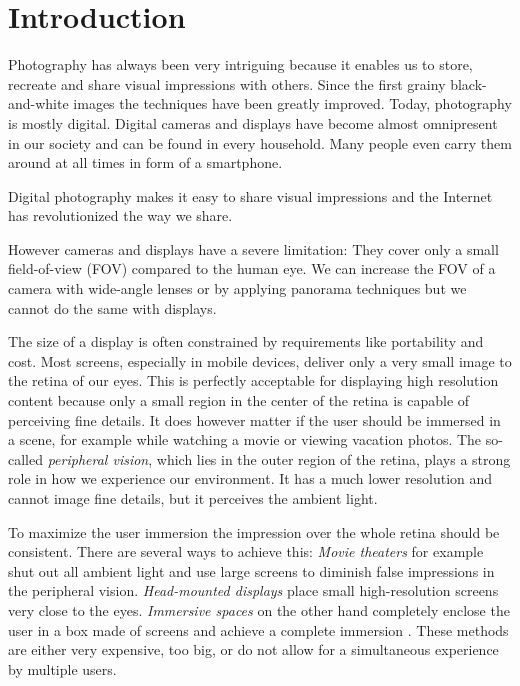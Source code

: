 \newcommand{\vect}[1]{\boldsymbol{#1}}

\chapter{Introduction}


Photography has always been very intriguing because it enables us to store, recreate and share visual impressions with others. 
Since the first grainy black-and-white images the techniques have been greatly improved. 
Today, photography is mostly digital. Digital cameras and displays have become almost omnipresent in our society and can be found in every household. 
Many people even carry them around at all times in form of a smartphone.

Digital photography makes it easy to share visual impressions and the Internet has revolutionized the way we share.

However cameras and displays have a severe limitation: They cover only a small field-of-view (FOV) compared to the human eye.
We can increase the FOV of a camera with wide-angle lenses or by applying panorama techniques but we cannot do the same with displays.

The size of a display is often constrained by requirements like portability and cost.
Most screens, especially in mobile devices, deliver only a very small image to the retina of our eyes.
This is perfectly acceptable for displaying high resolution content because only a small region in the center of the retina is capable of perceiving fine details.
It does however matter if the user should be immersed in a scene, for example while watching a movie or viewing vacation photos.
The so-called \emph{peripheral vision}, which lies in the outer region of the retina, plays a strong role in how we experience our environment.
It has a much lower resolution and cannot image fine details, but it perceives the ambient light.

To maximize the user immersion the impression over the whole retina should be consistent.
There are several ways to achieve this: 
\emph{Movie theaters} for example shut out all ambient light and use large screens to diminish false impressions in the peripheral vision. 
\emph{Head-mounted displays} place small high-resolution screens very close to the eyes.
\emph{Immersive spaces} on the other hand completely enclose the user in a box made of screens and achieve a complete immersion \cite{gross2003blue}.
These methods are either very expensive, too big, or do not allow for a simultaneous experience by multiple users.

